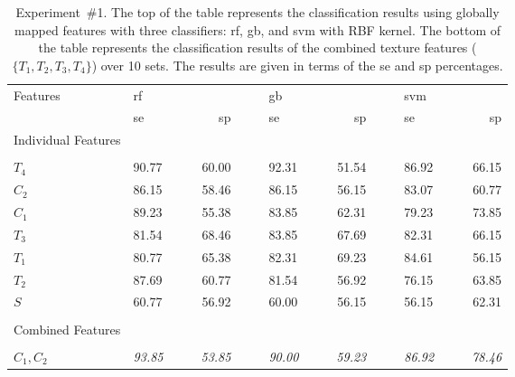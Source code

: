 \begin{table}
	\caption[Results obtained using globally mapped features, Experiment~\#1]{Experiment~\#1. The top of the table represents the classification results using globally mapped features with three classifiers: \acf{rf}, \acf{gb}, and \acf{svm} with RBF kernel. The bottom of the table represents the classification results of the combined texture features ($\{T_1,T_2,T_3,T_4\}$) over 10 sets. The results are given in terms of the \acf{se} and \acf{sp} percentages.}
	 \label{tab:globalmapResExp1}
\medskip
\centering	
\footnotesize{
	\begin{tabularx}{1.01\textwidth}{@{}l	lllr	 ll	lllr	 ll	lllr@{}}
	\toprule
	Features & \multicolumn{4}{l}{\ac{rf}} & & & \multicolumn{4}{l}{\ac{gb}} & & & \multicolumn{4}{l}{\ac{svm}}\\
	\cmidrule{2-5} \cmidrule{8-11} \cmidrule{14-17}
	& \ac{se} & & & \ac{sp} & & &  \ac{se} & & & \ac{sp} & & &  \ac{se} & & &  \ac{sp}\\
	\cmidrule{2-17}
	Individual Features\\
	\multicolumn{17}{l}{}\\[-1ex]
	$T_4$ & 90.77 & & &  60.00 & \multicolumn{2}{l}{} &  92.31 & & &  51.54 & \multicolumn{2}{l}{} &  86.92 & & & 66.15\\
	$C_2$ & 86.15 & & &  58.46 & \multicolumn{2}{l}{} & 86.15 & & &  56.15 & \multicolumn{2}{l}{} &  83.07 & & & 60.77 \\
    $C_1$ & 89.23 & & &  55.38 & \multicolumn{2}{l}{} & 83.85 & & &  62.31 & \multicolumn{2}{l}{} &  79.23 & & & 73.85 \\
    $T_3$ & 81.54 & & &  68.46 & \multicolumn{2}{l}{} & 83.85 & & &  67.69 & \multicolumn{2}{l}{} &  82.31 & & & 66.15\\
    $T_1$ & 80.77 & & &  65.38 & \multicolumn{2}{l}{} & 82.31 & & &  69.23 & \multicolumn{2}{l}{} &  84.61 & & & 56.15\\
    $T_2$ & 87.69 & & &  60.77 & \multicolumn{2}{l}{} & 81.54 & & &  56.92 & \multicolumn{2}{l}{} &  76.15 & & & 63.85 \\
    	$S$   & 60.77 & & &  56.92 & \multicolumn{2}{l}{} & 60.00 & & &  56.15 & \multicolumn{2}{l}{} &  56.15 & & & 62.31 \\
	\multicolumn{17}{l}{}\\
	Combined Features\\
	\multicolumn{17}{l}{}\\[-1ex]
	$C_1,C_2$ 					& \textit{93.85} 			& & & \textit{53.85} & \multicolumn{2}{l}{} & \textit{90.00} & & &\textit{59.23} & & &  \textit{86.92} & & &\textit{78.46}\\

\end{tabularx}}
\end{table}
